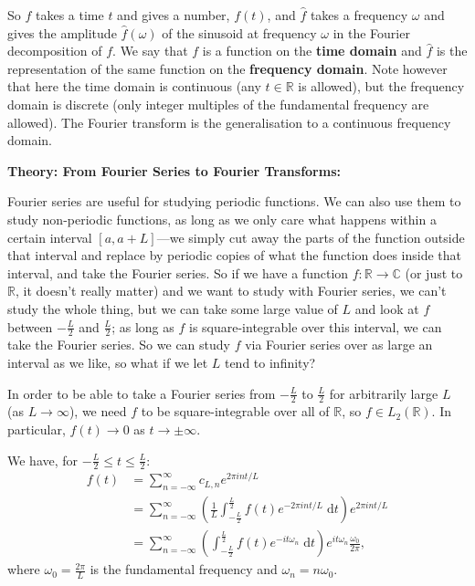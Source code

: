 \documentclass{article}
\newcommand{\diff}{\;\mathrm{d}}
\begin{document}
So $f$ takes a time $t$ and gives a number, $f(t)$, and $\hat{f}$ takes a frequency $\omega$ and gives the amplitude $\hat{f}(\omega)$ of the sinusoid at frequency $\omega$ in the Fourier decomposition of $f$. We say that $f$ is a function on the \textbf{time domain} and $\hat{f}$ is the representation of the same function on the \textbf{frequency domain}. Note however that here the time domain is continuous (any $t\in \mathbb{R}$ is allowed), but the frequency domain is discrete (only integer multiples of the fundamental frequency are allowed). The Fourier transform is the generalisation to a continuous frequency domain.


\clearpage












\textbf{Theory: From Fourier Series to Fourier Transforms:}\bigskip



Fourier series are useful for studying periodic functions. We can also use them to study non-periodic functions, as long as we only care what happens within a certain interval $[a,a+L]$---we simply cut away the parts of the function outside that interval and replace by periodic copies of what the function does inside that interval, and take the Fourier series. So if we have a function $f:\mathbb{R}\to \mathbb{C}$ (or just to $\mathbb{R}$, it doesn't really matter) and we want to study with Fourier series, we can't study the whole thing, but we can take some large value of $L$ and look at $f$ between $-\frac{L}{2}$ and $\frac{L}{2}$; as long as $f$ is square-integrable over this interval, we can take the Fourier series. So we can study $f$ via Fourier series over as large an interval as we like, so what if we let $L$ tend to infinity?

In order to be able to take a Fourier series from $-\frac{L}{2}$ to $\frac{L}{2}$ for arbitrarily large $L$ (as $L\to\infty$), we need $f$ to be square-integrable over all of $\mathbb{R}$, so $f\in L_2(\mathbb{R})$. In particular, $f(t)\to 0$ as $t\to \pm\infty$.

We have, for $-\frac{L}{2}\leq t\leq \frac{L}{2}$:
\begin{align*}
	f(t)&=\sum_{n=-\infty}^\infty c_{L,n} e^{2\pi i nt/L}\\
	&=\sum_{n=-\infty}^\infty \left(\frac{1}{L}\int_{-\frac{L}{2}}^{\frac{L}{2}}f(t)e^{-2\pi i nt/L}\diff t\right) e^{2\pi int/L}\\
	&= \sum_{n=-\infty}^\infty \left(\int_{-\frac{L}{2}}^{\frac{L}{2}} f(t) e^{-it\omega_n}\diff t \right) e^{it\omega_n}\frac{\omega_0}{2\pi},
\end{align*}
where $\omega_0=\frac{2\pi}{L}$ is the fundamental frequency and $\omega_n=n\omega_0$.
\end{document}
